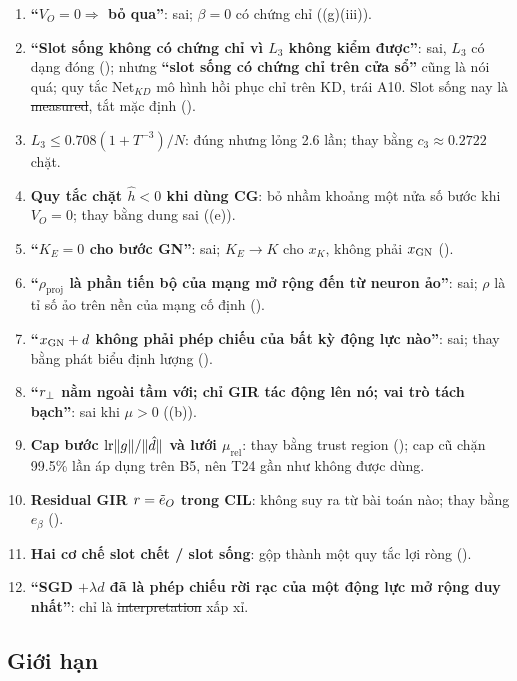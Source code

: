 \begin{enumerate}
\item \textbf{``$V_O=0\Rightarrow$ bỏ qua''}: sai; $\beta=0$ có chứng chỉ ((g)(iii)).
\item \textbf{``Slot sống không có chứng chỉ vì $L_3$ không kiểm được''}: sai, $L_3$ có dạng đóng (); nhưng \textbf{``slot sống có chứng chỉ trên cửa sổ''} cũng là nói quá; quy tắc Net$_{KD}$ mô hình hồi phục chỉ trên KD, trái A10. Slot sống nay là \st{measured}, tắt mặc định ().
\item \textbf{$L_3\le0.708(1+T^{-3})/N$}: đúng nhưng lỏng 2.6 lần; thay bằng $c_3\approx0.2722$ chặt.
\item \textbf{Quy tắc chặt $\hat h<0$ khi dùng CG}: bỏ nhầm khoảng một nửa số bước khi $V_O=0$; thay bằng dung sai ((e)).
\item \textbf{``$K_E=0$ cho bước GN''}: sai; $K_E\to K$ cho $x_K$, không phải $x_{\mathrm{GN}}$ ().
\item \textbf{``$\rho_{\mathrm{proj}}$ là phần tiến bộ của mạng mở rộng đến từ neuron ảo''}: sai; $\rho$ là tỉ số ảo trên nền của mạng cố định ().
\item \textbf{``$x_{\mathrm{GN}}+d$ không phải phép chiếu của bất kỳ động lực nào''}: sai; thay bằng phát biểu định lượng ().
\item \textbf{``$r_{\perp}$ nằm ngoài tầm với; chỉ GIR tác động lên nó; vai trò tách bạch''}: sai khi $\mu>0$ ((b)).
\item \textbf{Cap bước $\mathrm{lr}\lVert g\rVert/\lVert \hat d\rVert$ và lưới $\mu_{\mathrm{rel}}$}: thay bằng trust region (); cap cũ chặn 99.5\% lần áp dụng trên B5, nên T24 gần như không được dùng.
\item \textbf{Residual GIR $r=\tilde e_O$ trong CIL}: không suy ra từ bài toán nào; thay bằng $e_\beta$ ().
\item \textbf{Hai cơ chế slot chết / slot sống}: gộp thành một quy tắc lợi ròng ().
\item \textbf{``SGD $+\lambda d$ đã là phép chiếu rời rạc của một động lực mở rộng duy nhất''}: chỉ là \st{interpretation} xấp xỉ.
\end{enumerate}

\subsection{Giới hạn}


